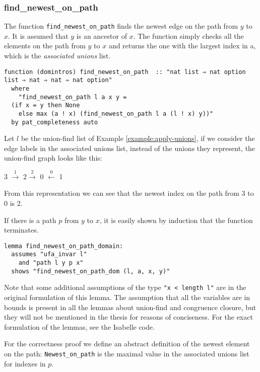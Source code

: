 \subsubsection{find\_newest\_on\_path}

The function \lstinline{find_newest_on_path} finds the newest edge on the path from $y$ to $x$. It is assumed that $y$ is an ancestor of $x$. The function simply checks all the elements on the path from $y$ to $x$ and returns the one with the largest index in a, which is the \emph{associated unions} list.

\begin{lstlisting}
function (domintros) find_newest_on_path  :: "nat list ⇒ nat option list ⇒ nat ⇒ nat ⇒ nat option"
  where
    "find_newest_on_path l a x y =
  (if x = y then None
    else max (a ! x) (find_newest_on_path l a (l ! x) y))"
  by pat_completeness auto
\end{lstlisting}

\begin{exmp}
Let $l$ be the union-find list of Example \ref{example:apply-unions}, if we consider the edge labels in the associated unions list, instead of the unions they represent, the union-find graph looks like this:

3 $\xrightarrow{\text{1}}$ 2$\xrightarrow{\text{2}}$ 0 $\xleftarrow{\text{0}}$ 1 \

From this representation we can see that the newest index on the path from 3 to 0 is 2.
\end{exmp}

If there is a path $p$ from $y$ to $x$, it is easily shown by induction that the function terminates.

\begin{lstlisting}
lemma find_newest_on_path_domain:
  assumes "ufa_invar l"
    and "path l y p x"
  shows "find_newest_on_path_dom (l, a, x, y)"
\end{lstlisting}

Note that some additional assumptions of the type \lstinline|"x < length l"| are in the original formulation of this lemma. The assumption that all the variables are in bounds is present in all the lemmas about union-find and congruence closure, but they will not be mentioned in the thesis for reasons of conciseness. For the exact formulation of the lemmas, see the Isabelle code.

For the correctness proof we define an abstract definition of the newest element on the path: \lstinline{Newest_on_path} is the maximal value in the associated unions list for indexes in $p$.

